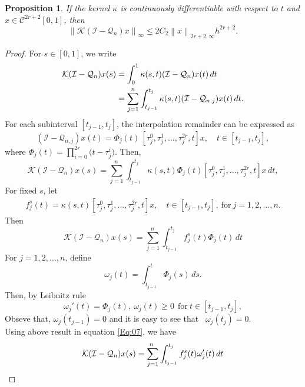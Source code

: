 \documentclass[]{interact}
\theoremstyle{plain}%
\newtheorem{proposition}[theorem]{Proposition}
\theoremstyle{definition}
\theoremstyle{remark}
\newcommand{\norm}[1]{\left\lVert #1\right\rVert}
\begin{document}
\begin{proposition} \label{Pr:01}
	If the kernel  $\kappa$ is continuously differentiable with respect to $t$ 
	and \(x \in \mathcal{C}^{2r+2}[0,1]\), then
	\[
	\norm{\mathcal{K}(\mathcal{I} - \mathcal{Q}_n)x }_\infty 
	\le 2C_2 \norm{x}_{2r+2, \infty} h^{2r + 2}.
	\]
\end{proposition}
\vspace*{-0.2in}
\begin{proof} For \(s \in [0,1]\), we write
	\begin{align*}
		\mathcal{K}(\mathcal{I} - \mathcal{Q}_n)x(s) &=\int_0^1  \kappa(s,t) (\mathcal{I} - \mathcal{Q}_{n}) x(t) \, dt \notag \\ 
		&= \sum_{j=1}^{n} \int_{t_{j-1}}^{t_j}  \kappa(s,t) (\mathcal{I} - \mathcal{Q}_{n,j})x(t) \, dt. \notag 
	\end{align*}
	For each subinterval $[t_{j-1},t_j]$, the interpolation remainder can be expressed as
	\[
	(\mathcal{I}-\mathcal{Q}_{n,j})x(t)
	= \Phi_j(t)\,[\tau_j^0,\tau_j^1,\ldots,\tau_j^{2r},t]x,
	\quad t\in[t_{j-1},t_j],
	\]
	where $	\Phi_j(t) = \prod_{i=0}^{2r} \bigl(t - \tau_j^i\bigr) $.
	Then,
	\[
	\mathcal{K}(\mathcal{I} - \mathcal{Q}_n)x(s) = \sum_{j=1}^{n ~}\int_{t_{j-1}}^{t_j}  \kappa(s,t) \Phi_j(t)  \left[\tau_j^0,\tau_j^1,\ldots, \tau_j^{2r},t\right]x \, dt,\]
	For fixed \(s\), let
	\begin{align*}
		f_j^s(t) =  \kappa(s,t) \left[\tau_j^0,\tau_j^1,\ldots, \tau_j^{2r},t\right]x, \quad t \in [t_{j-1}, t_j], ~ \text{for} ~ j=1,2,\ldots,n.
	\end{align*}
	Then
	\begin{equation} \label{Eq:07}
		\mathcal{K}(\mathcal{I} - \mathcal{Q}_n)x(s)= \sum_{j=1}^{n ~}\int_{t_{j-1}}^{t_j} f_j^s(t) \Phi_j(t) \, dt
	\end{equation}
	For $j = 1,2,\ldots,n$, define
	\begin{equation*}
		\omega_j(t) = \int_{t_{j-1}}^t \Phi_j(s) \, ds.
	\end{equation*}
	Then, by Leibnitz rule
	\begin{equation*}
		\omega_j'(t) =  \Phi_j(t), ~  \omega_j(t) \ge 0 ~~ \text{for}~ t \in [t_{j-1},t_j],
	\end{equation*}
	Obseve that, $	\omega_j(t_{j-1})=0$ and it is easy to see that ~$\omega_j(t_{j})=0$.\\
	Using above result in equation \eqref{Eq:07}, we have
	\begin{align} \label{Eq:08}
		\mathcal{K}(\mathcal{I} - \mathcal{Q}_n)x(s) &= \sum_{j=1}^{n ~}\int_{t_{j-1}}^{t_j} f_j^s(t) \omega_j'(t) \, dt \notag \\

\end{align}
\end{proof}
\end{document}
